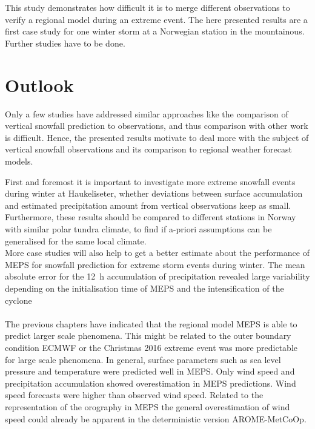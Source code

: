 \\
\\
This study demonstrates %
how difficult it is to merge different observations to verify a regional model during an extreme event.
The here presented results are a first %
case study for one winter storm at %
a Norwegian station in the mountainous. Further studies have to be done. 


\section{Outlook}
Only a few studies have addressed similar approaches like the comparison of vertical snowfall prediction to observations, and thus comparison with other work is difficult. Hence, the presented results motivate to deal more with the subject of vertical snowfall observations and its comparison to regional weather forecast models. 
\par\medskip
\noindent
First and foremost it is important to investigate more extreme snowfall events during winter at Haukeliseter, whether deviations between surface accumulation and estimated precipitation amount from vertical observations keep as small. Furthermore, these results should be compared to different stations in Norway with similar polar tundra climate, to find if a-priori assumptions can be generalised for the same local climate. 
\\
More case studies will also help to get a better estimate about the performance of MEPS for snowfall prediction for extreme  storm events during winter. 
The mean absolute error for the \SI{12}{\hour} accumulation of precipitation revealed large variability depending on the initialisation time of MEPS and the intensification of the cyclone %
\\
\\
The previous chapters have indicated that the regional model MEPS is able to predict larger scale phenomena. This might be related to the outer boundary condition ECMWF or the Christmas 2016 extreme event was more predictable for large scale phenomena. In general, surface parameters such as sea level pressure and temperature were predicted well in MEPS. Only wind speed and precipitation accumulation showed overestimation in MEPS predictions. Wind speed forecasts were higher than observed wind speed. Related to the representation of the orography in MEPS the general overestimation of wind speed could already be apparent in the deterministic version AROME-MetCoOp.

